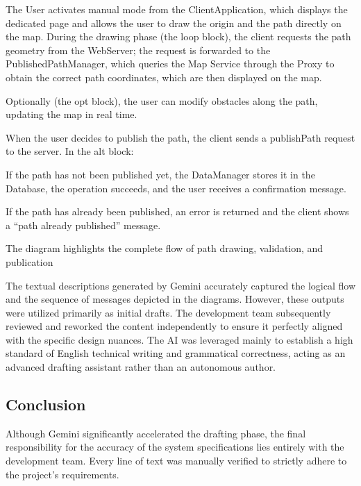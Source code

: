 \begin{GeminiGood}
\quad The User activates manual mode from the ClientApplication, which displays the dedicated page and allows the user to draw the origin and the path directly on the map. During the drawing phase (the loop block), the client requests the path geometry from the WebServer; the request is forwarded to the PublishedPathManager, which queries the Map Service through the Proxy to obtain the correct path coordinates, which are then displayed on the map.

Optionally (the opt block), the user can modify obstacles along the path, updating the map in real time.

When the user decides to publish the path, the client sends a publishPath request to the server. In the alt block:

If the path has not been published yet, the DataManager stores it in the Database, the operation succeeds, and the user receives a confirmation message.

If the path has already been published, an error is returned and the client shows a “path already published” message.

The diagram highlights the complete flow of path drawing, validation, and publication


    
\vspace{0.3cm}

\end{GeminiGood}

\vspace{0.5cm}



\noindent
The textual descriptions generated by Gemini accurately captured the logical flow and the sequence of messages depicted in the diagrams. However, these outputs were utilized primarily as initial drafts.
\noindent
The development team subsequently reviewed and reworked the content independently to ensure it perfectly aligned with the specific design nuances. The AI was leveraged mainly to establish a high standard of English technical writing and grammatical correctness, acting as an advanced drafting assistant rather than an autonomous author.

\subsection{Conclusion}
Although Gemini significantly accelerated the drafting phase, the final responsibility for the accuracy of the system specifications lies entirely with the development team. Every line of text was manually verified to strictly adhere to the project's requirements.
